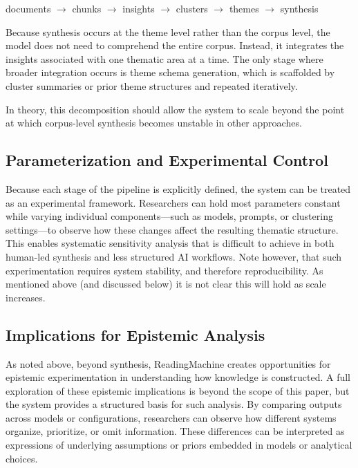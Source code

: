 \documentclass[
  11pt,
]{article}
\begin{document}
documents $\rightarrow$ chunks $\rightarrow$ insights $\rightarrow$ clusters $\rightarrow$ themes $\rightarrow$ synthesis

Because synthesis occurs at the theme level rather than the corpus
level, the model does not need to comprehend the entire corpus. Instead,
it integrates the insights associated with one thematic area at a time.
The only stage where broader integration occurs is theme schema
generation, which is scaffolded by cluster summaries or prior theme
structures and repeated iteratively.

In theory, this decomposition should allow the system to scale beyond
the point at which corpus-level synthesis becomes unstable in other
approaches.

\subsection{Parameterization and Experimental
Control}\label{parameterization-and-experimental-control}

Because each stage of the pipeline is explicitly defined, the system can
be treated as an experimental framework. Researchers can hold most
parameters constant while varying individual components---such as
models, prompts, or clustering settings---to observe how these changes
affect the resulting thematic structure. This enables systematic
sensitivity analysis that is difficult to achieve in both human-led
synthesis and less structured AI workflows. Note however, that such
experimentation requires system stability, and therefore
reproducibility. As mentioned above (and discussed below) it is not
clear this will hold as scale increases.

\subsection{Implications for Epistemic
Analysis}\label{implications-for-epistemic-analysis}

As noted above, beyond synthesis, ReadingMachine creates opportunities
for epistemic experimentation in understanding how knowledge is
constructed. A full exploration of these epistemic implications is
beyond the scope of this paper, but the system provides a structured
basis for such analysis. By comparing outputs across models or
configurations, researchers can observe how different systems organize,
prioritize, or omit information. These differences can be interpreted as
expressions of underlying assumptions or priors embedded in models or
analytical choices.
\end{document}
